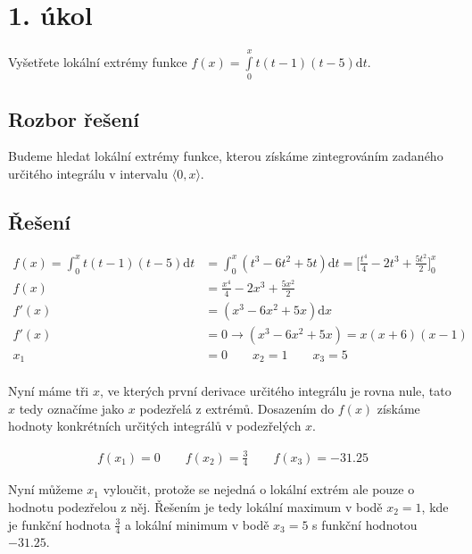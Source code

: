 \section{1. úkol}
Vyšetřete lokální extrémy funkce $f(x) = \int\limits_0^x t(t-1)(t-5)\mathrm{d}t$.

\subsection*{Rozbor řešení}
Budeme hledat lokální extrémy funkce, kterou získáme zintegrováním zadaného určitého integrálu v intervalu $\langle 0, x \rangle$.

\subsection*{Řešení}
\begin{align*}
	f(x) = \int_0^x t(t-1)(t-5)\mathrm{d}t & = \int_0^x (t^3 - 6t^2 + 5t)\mathrm{d}t = \Big[\frac{t^4}{4} - 2t^3 + \frac{5t^2}{2}\Big]_0^x \\
	f(x) & = \frac{x^4}{4} - 2x^3 + \frac{5x^2}{2} \\
	f'(x) & = (x^3 - 6x^2 + 5x)\mathrm{d}x \\
	f'(x) & = 0  \rightarrow (x^3 - 6x^2 + 5x) = x(x + 6)(x - 1) \\
	x_1 & = 0 \qquad x_2 = 1\qquad x_3 = 5 \\
\end{align*}

Nyní máme tři $x$, ve kterých první derivace určitého integrálu je rovna nule, tato $x$ tedy označíme jako $x$ podezřelá z extrémů. Dosazením do $f(x)$ získáme hodnoty konkrétních určitých integrálů v podezřelých $x$.

\begin{align*}
	f(x_1) = 0 \qquad f(x_2) = \frac{3}{4} \qquad f(x_3) = -31.25
\end{align*}

Nyní můžeme $x_1$ vyloučit, protože se nejedná o lokální extrém ale pouze o hodnotu podezřelou z něj. Řešením je tedy lokální maximum v bodě $x_2 = 1$, kde je funkční hodnota $\frac{3}{4}$ a lokální minimum v bodě $x_3 = 5$ s funkční hodnotou $-31.25$.